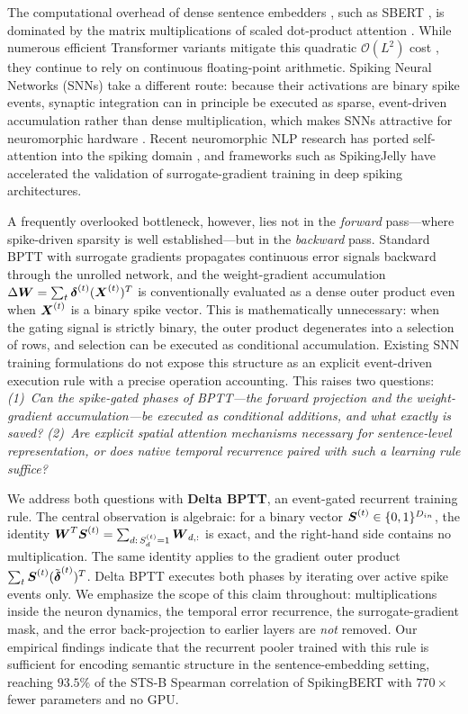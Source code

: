 \documentclass[10pt,journal,compsoc]{IEEEtran}
\begin{document}
The computational overhead of dense sentence embedders \cite{devlin2018bert}, such as SBERT \cite{reimers2019sentence}, is dominated by the matrix multiplications of scaled dot-product attention \cite{vaswani2017attention}. While numerous efficient Transformer variants mitigate this quadratic $\mathcal{O}(L^2)$ cost \cite{tay2022efficient}, they continue to rely on continuous floating-point arithmetic. Spiking Neural Networks (SNNs) take a different route: because their activations are binary spike events, synaptic integration can in principle be executed as sparse, event-driven accumulation rather than dense multiplication, which makes SNNs attractive for neuromorphic hardware \cite{roy2019towards}. Recent neuromorphic NLP research has ported self-attention into the spiking domain \cite{li2022spikeformer, zhu2023spikegpt}, and frameworks such as SpikingJelly \cite{fang2023spikingjelly} have accelerated the validation of surrogate-gradient training in deep spiking architectures.

A frequently overlooked bottleneck, however, lies not in the \emph{forward} pass---where spike-driven sparsity is well established---but in the \emph{backward} pass. Standard BPTT with surrogate gradients \cite{neftci2019surrogate} propagates continuous error signals backward through the unrolled network, and the weight-gradient accumulation $\Delta\boldsymbol{W} = \sum_t \boldsymbol{\delta}^{(t)} (\boldsymbol{X}^{(t)})^T$ is conventionally evaluated as a dense outer product even when $\boldsymbol{X}^{(t)}$ is a binary spike vector. This is mathematically unnecessary: when the gating signal is strictly binary, the outer product degenerates into a selection of rows, and selection can be executed as conditional accumulation. Existing SNN training formulations do not expose this structure as an explicit event-driven execution rule with a precise operation accounting. This raises two questions: \textit{(1)~Can the spike-gated phases of BPTT---the forward projection and the weight-gradient accumulation---be executed as conditional additions, and what exactly is saved? (2)~Are explicit spatial attention mechanisms necessary for sentence-level representation, or does native temporal recurrence paired with such a learning rule suffice?}

We address both questions with \textbf{Delta BPTT}, an event-gated recurrent training rule. The central observation is algebraic: for a binary vector $\boldsymbol{S}^{(t)} \in \{0,1\}^{D_{in}}$, the identity $\boldsymbol{W}^T \boldsymbol{S}^{(t)} = \sum_{d:\,S^{(t)}_d = 1} \boldsymbol{W}_{d,:}$ is exact, and the right-hand side contains no multiplication. The same identity applies to the gradient outer product $\sum_t \boldsymbol{S}^{(t)}(\tilde{\boldsymbol{\delta}}^{(t)})^T$. Delta BPTT executes both phases by iterating over active spike events only. We emphasize the scope of this claim throughout: multiplications inside the neuron dynamics, the temporal error recurrence, the surrogate-gradient mask, and the error back-projection to earlier layers are \emph{not} removed. Our empirical findings indicate that the recurrent pooler trained with this rule is sufficient for encoding semantic structure in the sentence-embedding setting, reaching $93.5\%$ of the STS-B Spearman correlation of SpikingBERT \cite{bal2024spikingbert} with $770\times$ fewer parameters and no GPU.
\end{document}
